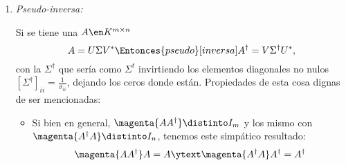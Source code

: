 \begin{enumerate}[label=\tiny\purple{\faIcon{snowman}}]
  \item \textit{Pseudo-inversa:}

        Si se tiene una $A \en K^{m \times n}$
        $$
          A = U \Sigma V^*
          \Entonces{pseudo}[inversa]
          A^\dagger = V \Sigma^\dagger U^*,
        $$
        con la $\Sigma^\dagger$ que sería como $\Sigma^t$ invirtiendo los elementos diagonales no nulos
        $[\Sigma^\dagger]_{ii} = \frac{1}{\sigma_{ii}}$, dejando los ceros donde están.
        Propiedades de esta cosa dignas de ser mencionadas:
        \begin{itemize}
          \item Si bien en general, $\magenta{A A^\dagger} \distinto I_m$
                y los mismo con $\magenta{A^\dagger A} \distinto I_n$, tenemos este simpático resultado:
                $$
                  \magenta{A A^\dagger} A = A
                  \ytext
                  \magenta{A^\dagger A} A^\dagger = A^\dagger
                $$

        \end{itemize}
\end{enumerate}
